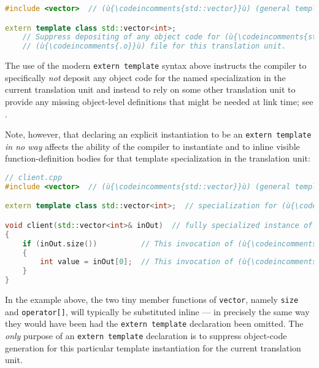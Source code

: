 \begin{lstlisting}[language=C++]
#include <vector>  // (ù{\codeincomments{std::vector}}ù) (general template)

extern template class std::vector<int>;
    // Suppress depositing of any object code for (ù{\codeincomments{std::vector<int>}}ù) into the
    // (ù{\codeincomments{.o}}ù) file for this translation unit.
\end{lstlisting}
    
\noindent The use of the modern \lstinline!extern!~\lstinline!template! syntax above
instructs the compiler to specifically \emph{not} deposit any object
code for the named specialization in the current translation unit and
instead to rely on some other translation unit to provide any missing
object-level definitions that might be needed at link time; see
.

Note, however, that declaring an explicit instantiation to be an
\lstinline!extern!~\lstinline!template! \emph{in no way} affects the ability
of the compiler to instantiate and to inline visible function-definition
bodies for that template specialization in the translation unit:

\begin{lstlisting}[language=C++]
// client.cpp
#include <vector>  // (ù{\codeincomments{std::vector}}ù) (general template)

extern template class std::vector<int>;  // specialization for (ù{\codeincomments{int}}ù) elements

void client(std::vector<int>& inOut)  // fully specialized instance of a (ù{\codeincomments{vector}}ù)
{
    if (inOut.size())          // This invocation of (ù{\codeincomments{size}}ù) can inline.
    {
        int value = inOut[0];  // This invocation of (ù{\codeincomments{operator[]}}ù) can inline.
    }
}
\end{lstlisting}
    
\noindent In the example above, the two tiny member functions of \lstinline!vector!,
namely \lstinline!size! and \lstinline!operator[]!, will typically be
substituted inline --- in precisely the same way they would have been
had the \lstinline!extern!~\lstinline!template! declaration been omitted. The
\emph{only} purpose of an \lstinline!extern!~\lstinline!template! declaration
is to suppress object-code generation for this particular template
instantiation for the current translation unit.

